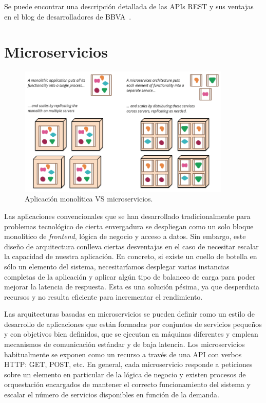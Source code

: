 Se puede encontrar una descripción detallada de las APIs REST y sus ventajas en el blog de desarrolladores de BBVA~\cite{restapi}.

\section{Microservicios}\label{sec:micro}
\begin{figure}
\centering
\includegraphics[width=0.9\textwidth]{sketch.png}
\caption{\label{fig:msv}Aplicación monolítica VS microservicios.}
\end{figure}

Las aplicaciones convencionales que se han desarrollado tradicionalmente para problemas tecnológico de cierta envergadura se despliegan como un solo bloque monolítico de \textit{frontend}, lógica de negocio y acceso a datos. Sin embargo, este diseño de arquitectura conlleva ciertas desventajas en el caso de necesitar escalar la capacidad de nuestra aplicación. En concreto, si existe un cuello de botella en sólo un elemento del sistema, necesitaríamos desplegar varias instancias completas de la aplicación y aplicar algún tipo de balanceo de carga para poder mejorar la latencia de respuesta. Esta es una solución pésima, ya que desperdicia recursos y no resulta eficiente para incrementar el rendimiento.

Las arquitecturas basadas en microservicios se pueden definir como un estilo de desarrollo de aplicaciones que están formadas por conjuntos de servicios pequeños y con objetivos bien definidos, que se ejecutan en máquinas diferentes y emplean mecanismos de comunicación estándar y de baja latencia. Los microservicios habitualmente se exponen como un recurso a través de una API con verbos HTTP: GET, POST, etc. En general, cada microservicio responde a peticiones sobre un elemento en particular de la lógica de negocio y existen procesos de orquestación encargados de mantener el correcto funcionamiento del sistema y escalar el número de servicios disponibles en función de la demanda.

